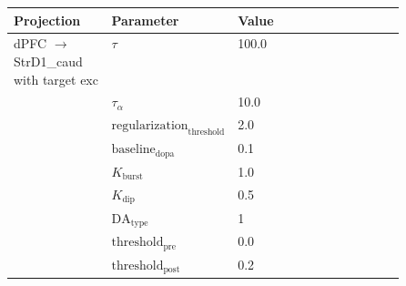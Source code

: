 \documentclass{article}
\begin{document}
\noindent
\begin{tabularx}{\linewidth}{|p{0.25\linewidth}|p{0.25\linewidth}|X|}\hline
\textbf{Projection} & \textbf{Parameter} & \textbf{Value}   \\ \hline

    dPFC  $\rightarrow$ StrD1\_caud with target exc & $\tau$        & 100.0  \\ \hline

     & $\tau_\alpha$        & 10.0  \\ \hline

     & ${\text{regularization}}_{\text{threshold}}$        & 2.0  \\ \hline

     & ${\text{baseline}}_{\text{dopa}}$        & 0.1  \\ \hline

     & $K_{\text{burst}}$        & 1.0  \\ \hline

     & $K_{\text{dip}}$        & 0.5  \\ \hline

     & ${\text{DA}}_{\text{type}}$        & 1  \\ \hline

     & ${\text{threshold}}_{\text{pre}}$        & 0.0  \\ \hline

     & ${\text{threshold}}_{\text{post}}$        & 0.2  \\ \hline

\end{tabularx}

\vspace{2ex}
\end{document}
